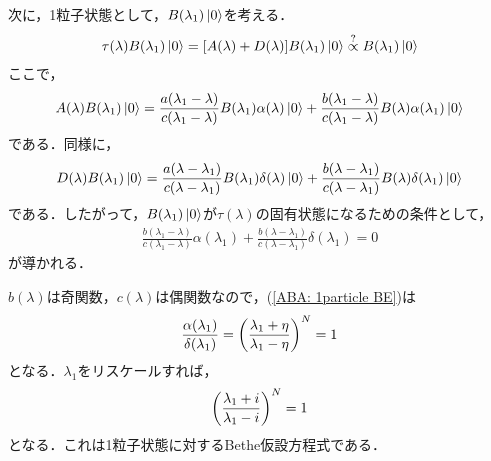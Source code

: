 \documentclass[dvipdfmx,9pt]{beamer}
\numberwithin{equation}{section}
\begin{document}
\begin{frame}{}
    次に，1粒子状態として，$B(\lambda_1)\ket{0}$を考える．
    \begin{align}
        \tau(\lambda)B(\lambda_1)\ket{0}
        = \qty[A(\lambda) + D(\lambda)]B(\lambda_1)\ket{0}
        \overset{?}{\propto} B(\lambda_1)\ket{0}
    \end{align}
    ここで，
    \begin{align}
        A(\lambda)B(\lambda_1)\ket{0}
        = \frac{a(\lambda_1-\lambda)}{c(\lambda_1-\lambda)}B(\lambda_1)\alpha(\lambda)\ket{0} + \frac{b(\lambda_1-\lambda)}{c(\lambda_1-\lambda)}B(\lambda)\alpha(\lambda_1)\ket{0}
    \end{align}
    である．同様に，
    \begin{align}
        D(\lambda)B(\lambda_1)\ket{0}
        = \frac{a(\lambda-\lambda_1)}{c(\lambda-\lambda_1)}B(\lambda_1)\delta(\lambda)\ket{0} + \frac{b(\lambda-\lambda_1)}{c(\lambda-\lambda_1)}B(\lambda)\delta(\lambda_1)\ket{0}
    \end{align}
    である．したがって，$B(\lambda_1)\ket{0}$が$\tau(\lambda)$の固有状態になるための条件として，
    \begin{align}
        \frac{b(\lambda_1-\lambda)}{c(\lambda_1-\lambda)}\alpha(\lambda_1) + \frac{b(\lambda-\lambda_1)}{c(\lambda-\lambda_1)}\delta(\lambda_1) = 0
        \label{ABA: 1particle BE}
    \end{align}
    が導かれる．
\end{frame}

\begin{frame}{}
    $b(\lambda)$は奇関数，$c(\lambda)$は偶関数なので，(\ref{ABA: 1particle BE})は
    \begin{align}
        \frac{\alpha(\lambda_1)}{\delta(\lambda_1)} = \qty(\frac{\lambda_1 + \eta}{\lambda_1 - \eta})^{N} = 1
    \end{align}
    となる．$\lambda_1$をリスケールすれば，
    \begin{align}
        \qty(\frac{\lambda_1 + i}{\lambda_1 - i})^N = 1
    \end{align}
    となる．これは1粒子状態に対するBethe仮設方程式である．
\end{frame}
\end{document}
